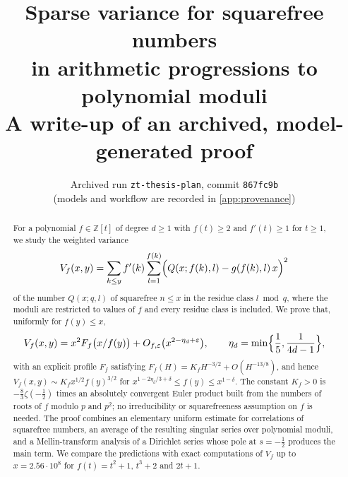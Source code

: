 \documentclass[11pt,a4paper]{report}
\title{Sparse variance for squarefree numbers\\ in arithmetic progressions to polynomial moduli\\[1ex]
\large A write-up of an archived, model-generated proof}
\author{Archived run \texttt{zt-thesis-plan}, commit \texttt{867fc9b}\\
\small (models and workflow are recorded in \cref{app:provenance})}
\date{}
\numberwithin{equation}{chapter}
\newcommand{\Z}{\mathbb Z}
\newcommand{\eps}{\varepsilon}
\begin{document}
\maketitle

\begin{abstract}
For a polynomial $f\in\Z[t]$ of degree $d\ge1$ with $f(t)\ge2$ and $f'(t)\ge1$ for $t\ge1$, we study the weighted variance
\[
V_f(x,y)=\sum_{k\le y}f'(k)\sum_{l=1}^{f(k)}\Bigl(Q(x;f(k),l)-g(f(k),l)\,x\Bigr)^2
\]
of the number $Q(x;q,l)$ of squarefree $n\le x$ in the residue class $l\bmod q$, where the moduli are restricted to values of $f$ and every residue class is included. We prove that, uniformly for $f(y)\le x$,
\[
V_f(x,y)=x^2F_f\bigl(x/f(y)\bigr)+O_{f,\eps}\bigl(x^{2-\eta_d+\eps}\bigr),\qquad \eta_d=\min\Bigl\{\frac15,\frac1{4d-1}\Bigr\},
\]
with an explicit profile $F_f$ satisfying $F_f(H)=K_fH^{-3/2}+O(H^{-13/8})$, and hence
$V_f(x,y)\sim K_fx^{1/2}f(y)^{3/2}$ for $x^{1-2\eta_d/3+\delta}\le f(y)\le x^{1-\delta}$. The constant $K_f>0$ is $-\frac83\zeta(-\frac12)$ times an absolutely convergent Euler product built from the numbers of roots of $f$ modulo $p$ and $p^2$; no irreducibility or squarefreeness assumption on $f$ is needed. The proof combines an elementary uniform estimate for correlations of squarefree numbers, an average of the resulting singular series over polynomial moduli, and a Mellin-transform analysis of a Dirichlet series whose pole at $s=-\frac12$ produces the main term. We compare the predictions with exact computations of $V_f$ up to $x=2.56\cdot10^8$ for $f(t)=t^2+1$, $t^3+2$ and $2t+1$.
\end{abstract}

\tableofcontents












\appendix
{}





\end{document}
